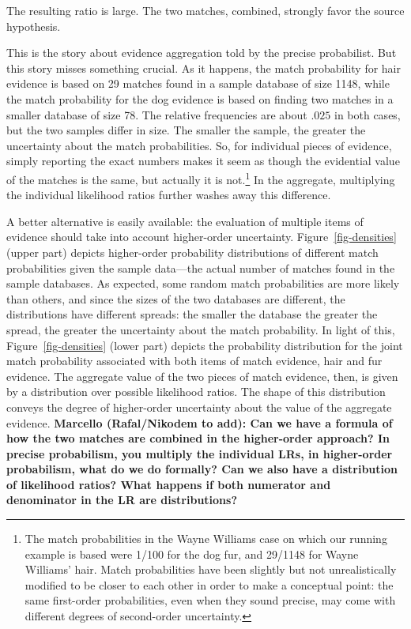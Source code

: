 \documentclass[
  letterpaper,
  DIV=11,
  numbers=noendperiod]{scrartcl}
\begin{document}
\noindent The resulting ratio is large. The two matches, combined,
strongly favor the source hypothesis.

This is the story about evidence aggregation told by the precise
probabilist. But this story misses something crucial. As it happens, the
match probability for hair evidence is based on 29 matches found in a
sample database of size 1148, while the match probability for the dog
evidence is based on finding two matches in a smaller database of size
78. The relative frequencies are about \(.025\) in both cases, but the
two samples differ in size. The smaller the sample, the greater the
uncertainty about the match probabilities. So, for individual pieces of
evidence, simply reporting the exact numbers makes it seem as though the
evidential value of the matches is the same, but actually it is
not.\footnote{The match probabilities in the Wayne Williams case on
  which our running example is based were 1/100 for the dog fur, and
  29/1148 for Wayne Williams' hair. Match probabilities have been
  slightly but not unrealistically modified to be closer to each other
  in order to make a conceptual point: the same first-order
  probabilities, even when they sound precise, may come with different
  degrees of second-order uncertainty.} In the aggregate, multiplying
the individual likelihood ratios further washes away this difference.

A better alternative is easily available: the evaluation of multiple
items of evidence should take into account higher-order uncertainty.
Figure~\ref{fig-densities} (upper part) depicts higher-order probability
distributions of different match probabilities given the sample
data---the actual number of matches found in the sample databases. As
expected, some random match probabilities are more likely than others,
and since the sizes of the two databases are different, the
distributions have different spreads: the smaller the database the
greater the spread, the greater the uncertainty about the match
probability. In light of this, Figure~\ref{fig-densities} (lower part)
depicts the probability distribution for the joint match probability
associated with both items of match evidence, hair and fur evidence. The
aggregate value of the two pieces of match evidence, then, is given by a
distribution over possible likelihood ratios.
 The shape of this distribution
conveys the degree of higher-order uncertainty about the value of the
aggregate evidence.
\textbf{Marcello (Rafal/Nikodem to add): Can we have a formula of how the two matches are combined in the higher-order approach? In precise probabilism, you multiply the individual LRs, in higher-order probabilism, what do we do formally? Can we also have a distribution of likelihood ratios? What happens if both numerator and denominator in the LR are distributions?}
\end{document}
